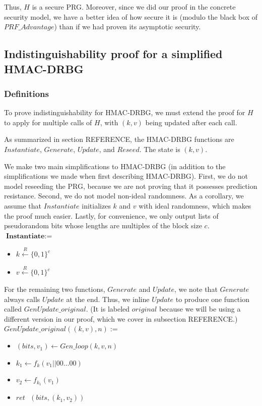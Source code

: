 \documentclass[12pt,lot, lof]{puthesis}
\newenvironment{game}
{ \begin{itemize}[noitemsep,nolistsep] 
}
{ \end{itemize}                  }
\newcommand{\s} {\textrm{ }}
\newcommand{\samp}{\xleftarrow{R} \{0,1\}}
\newcommand{\lar}{\leftarrow}
\begin{document}
Thus, $H$ is a secure PRG. Moreover, since we did our proof in the concrete security model, we have a better idea of how secure it is (modulo the black box of $PRF\_Advantage$) than if we had proven its asymptotic security.


\subsection{Indistinguishability proof for a simplified HMAC-DRBG}
\subsubsection{Definitions}
To prove indistinguishability for HMAC-DRBG, we must extend the proof for $H$ to apply for multiple calls of $H$, with $(k, v)$ being updated after each call.

As summarized in section REFERENCE, the HMAC-DRBG functions are $Instantiate$, $Generate$, $Update$, and $Reseed$. The state is $(k, v)$.

We make two main simplifications to HMAC-DRBG (in addition to the simplifications we made when first describing HMAC-DRBG). First, we do not model reseeding the PRG, because we are not proving that it possesses prediction resistance. Second, we do not model non-ideal randomness. As a corollary, we assume that $Instantiate$ initializes $k$ and $v$ with ideal randomness, which makes the proof much easier. Lastly, for convenience, we only output lists of pseudorandom bits whose lengths are multiples of the block size $c$. \\

$\textbf{Instantiate} := $
\begin{game}
  \item[] $k \samp^c$
  \item[] $v \samp^c$ \\
\end{game}

For the remaining two functions, $Generate$ and $Update$, we note that $Generate$ always calls $Update$ at the end. Thus, we inline $Update$ to produce one function called $GenUpdate\_original$. (It is labeled $original$ because we will be using a different version in our proof, which we cover in subsection REFERENCE.)\\

$GenUpdate\_original((k, v), n) :=$
\begin{game}
\item[] $(bits, v_1) \lar Gen\_loop(k, v, n)$
\item[] $k_1 \lar f_k(v_1 || 00 \ldots 00)$
\item[] $v_2 \lar f_{k_1}(v_1)$
\item[] $ret \s (bits, (k_1, v_2))$\\
\end{game}
\end{document}
